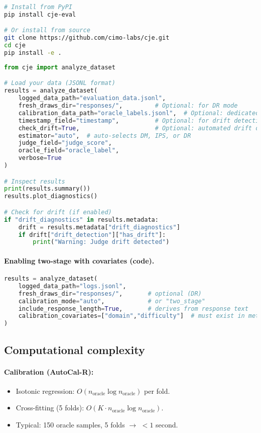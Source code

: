 \begin{lstlisting}[language=bash,caption=Installation]
# Install from PyPI
pip install cje-eval

# Or install from source
git clone https://github.com/cimo-labs/cje.git
cd cje
pip install -e .
\end{lstlisting}

\begin{lstlisting}[language=Python,caption=Quickstart Example]
from cje import analyze_dataset

# Load your data (JSONL format)
results = analyze_dataset(
    logged_data_path="evaluation_data.jsonl",
    fresh_draws_dir="responses/",         # Optional: for DR mode
    calibration_data_path="oracle_labels.jsonl",  # Optional: dedicated calibration set
    timestamp_field="timestamp",          # Optional: for drift detection
    check_drift=True,                     # Optional: automated drift detection
    estimator="auto",  # auto-selects DM, IPS, or DR
    judge_field="judge_score",
    oracle_field="oracle_label",
    verbose=True
)

# Inspect results
print(results.summary())
results.plot_diagnostics()

# Check for drift (if enabled)
if "drift_diagnostics" in results.metadata:
    drift = results.metadata["drift_diagnostics"]
    if drift["drift_detection"]["has_drift"]:
        print("Warning: Judge drift detected")
\end{lstlisting}

\paragraph{Enabling two-stage with covariates (code).}
\begin{lstlisting}[language=Python]
results = analyze_dataset(
    logged_data_path="logs.jsonl",
    fresh_draws_dir="responses/",       # optional (DR)
    calibration_mode="auto",            # or "two_stage"
    include_response_length=True,       # derives from response text
    calibration_covariates=["domain","difficulty"]  # must exist in metadata
)
\end{lstlisting}

\subsection{Computational complexity}

\paragraph{Calibration (AutoCal-R):}
\begin{itemize}
\item Isotonic regression: $O(n_{\text{oracle}} \log n_{\text{oracle}})$ per fold.
\item Cross-fitting (5 folds): $O(K \cdot n_{\text{oracle}} \log n_{\text{oracle}})$.
\item Typical: 150 oracle samples, 5 folds $\to$ $< 1$ second.
\end{itemize}

